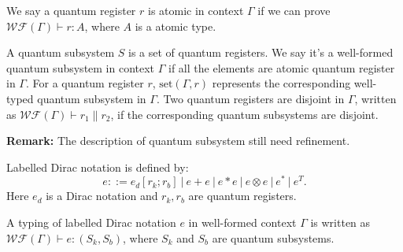 \begin{definition}
  We say a quantum register $r$ is atomic in context $\Gamma$ if we can prove
  $\mathcal{WF}(\Gamma) \vdash r : A$, where $A$ is a atomic type.
\end{definition}

\begin{definition}
  A quantum subsystem $S$ is a set of quantum registers. 
  We say it's a well-formed quantum subsystem in context $\Gamma$ if all the elements are atomic quantum register in $\Gamma$. 
  For a quantum register $r$, $\mathrm{set}(\Gamma, r)$ represents the corresponding well-typed quantum subsystem in $\Gamma$.
  Two quantum registers are disjoint in $\Gamma$, written as $\mathcal{WF}(\Gamma) \vdash r_1 \| r_2$, if the corresponding quantum subsystems are disjoint.
\end{definition}
\textbf{Remark:} The description of quantum subsystem still need refinement.

\begin{definition}
    Labelled Dirac notation is defined by:
    $$
    e ::= e_d [r_k; r_b]\ |\ e + e\ |\ e * e\ |\ e \otimes e\ |\ e^*\ |\ e^T.
    $$
    Here $e_d$ is a Dirac notation and $r_k, r_b$ are quantum registers.
\end{definition}

\begin{definition}
  A typing of labelled Dirac notation $e$ in well-formed context $\Gamma$ is written as $\mathcal{WF}(\Gamma) \vdash e : (S_k, S_b)$, where $S_k$ and $S_b$ are quantum subsystems. 
\end{definition}

